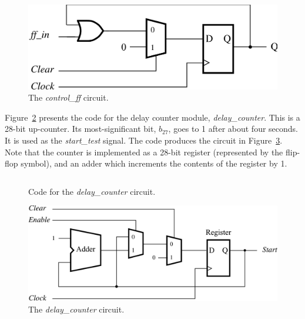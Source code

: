 \documentclass[11pt, twoside, pdftex]{article}
\begin{document}
\begin{figure}[H]
   \begin{center}
      \includegraphics[scale=1]{figures/figure4.png}
   \caption{The {\it control\_ff} circuit.} 
	 \label{fig:4}
	 \end{center}
\end{figure}

Figure~\ref{fig:5} presents the code for the delay counter module, {\it delay\_counter}.
This is a 28-bit up-counter. Its most-significant bit, $b_{27}$,
goes to 1 after about four seconds. It is used as the {\it start\_test} signal.
The code produces the circuit in Figure~\ref{fig:6}. Note that the
counter is implemented as a 28-bit register (represented by the flip-flop symbol),
and an adder which increments the contents of the register by 1.

\begin{figure}[H]
\begin{center} %
\begin{tabular}{c}

\end{tabular}
\end{center}
	\caption{Code for the {\it delay\_counter} circuit.}
	\label{fig:5}
\end{figure}
 
\begin{figure}[H]
   \begin{center}
      \includegraphics[scale=1]{figures/figure6.png}
   \caption{The {\it delay\_counter} circuit.} 
	 \label{fig:6}
	 \end{center}
\end{figure}
\end{document}

